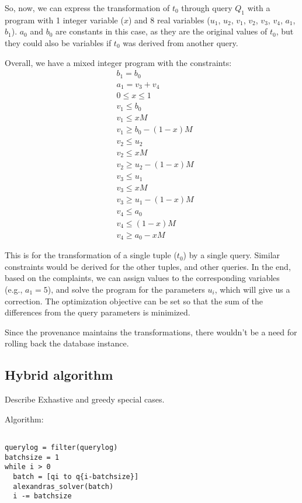 So, now, we can express the transformation of $t_0$ through query $Q_1$ with a
program with 1 integer variable ($x$) and 8 real variables ($u_1$, $u_2$,
$v_1$, $v_2$, $v_3$, $v_4$, $a_1$, $b_1$). $a_0$ and $b_0$ are constants in
this case, as they are the original values of $t_0$, but they could also be
variables if $t_0$ was derived from another query.

Overall, we have a mixed integer program with the constraints:
\begin{align*}
    &b_1=b_0\\
    &a_1 = v_3+v_4\\
    &0\leq x\leq 1\\
    &v_1\le b_0\\
    &v_1\le xM\\
    &v_1\ge b_0 - (1-x)M\\
    &v_2\le u_2\\
    &v_2\le xM\\
    &v_2\ge u_2 - (1-x)M\\
    &v_3\le u_1\\
    &v_3\le xM\\
    &v_3\ge u_1 - (1-x)M\\
    &v_4\le a_0\\
    &v_4\le (1-x)M\\
    &v_4\ge a_0 - xM
\end{align*}

\smallskip 

This is for the transformation of a single tuple ($t_0$) by a single query.
Similar constraints would be derived for the other tuples, and other queries.
In the end, based on the complaints, we can assign values to the corresponding
variables (e.g., $a_1=5$), and solve the program for the parameters $u_i$,
which will give us a correction. The optimization objective can be set so that
the sum of the differences from the query parameters is minimized.

\smallskip

Since the provenance maintains the transformations, there wouldn't be a need
for rolling back the database instance.



\subsection{Hybrid algorithm}

Describe Exhastive and greedy special cases.


Algorithm:

\begin{verbatim}

querylog = filter(querylog)
batchsize = 1
while i > 0
  batch = [qi to q{i-batchsize}]
  alexandras_solver(batch)
  i -= batchsize

\end{verbatim}
